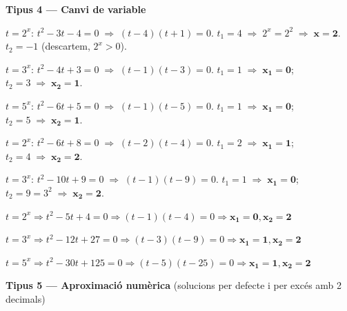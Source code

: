 \documentclass[12pt,a4paper]{article}
\begin{document}
\vspace{0.3cm}

\noindent\textbf{Tipus 4 --- Canvi de variable}

\begin{exercicis}
    \item $t=2^x$: $t^2-3t-4=0 \;\Rightarrow\; (t-4)(t+1)=0$. \quad $t_1=4\;\Rightarrow\;2^x=2^2\;\Rightarrow\;\boldsymbol{x=2}$. \quad $t_2=-1$ (descartem, $2^x>0$).
    \item $t=3^x$: $t^2-4t+3=0 \;\Rightarrow\; (t-1)(t-3)=0$. \quad $t_1=1\;\Rightarrow\;\boldsymbol{x_1=0}$; \quad $t_2=3\;\Rightarrow\;\boldsymbol{x_2=1}$.
    \item $t=5^x$: $t^2-6t+5=0 \;\Rightarrow\; (t-1)(t-5)=0$. \quad $t_1=1\;\Rightarrow\;\boldsymbol{x_1=0}$; \quad $t_2=5\;\Rightarrow\;\boldsymbol{x_2=1}$.
    \item $t=2^x$: $t^2-6t+8=0 \;\Rightarrow\; (t-2)(t-4)=0$. \quad $t_1=2\;\Rightarrow\;\boldsymbol{x_1=1}$; \quad $t_2=4\;\Rightarrow\;\boldsymbol{x_2=2}$.
    \item $t=3^x$: $t^2-10t+9=0 \;\Rightarrow\; (t-1)(t-9)=0$. \quad $t_1=1\;\Rightarrow\;\boldsymbol{x_1=0}$; \quad $t_2=9=3^2\;\Rightarrow\;\boldsymbol{x_2=2}$.
    \item $t=2^x \Rightarrow t^2-5t+4=0 \Rightarrow (t-1)(t-4)=0 \Rightarrow \boldsymbol{x_1=0, x_2=2}$
    \item $t=3^x \Rightarrow t^2-12t+27=0 \Rightarrow (t-3)(t-9)=0 \Rightarrow \boldsymbol{x_1=1, x_2=2}$
    \item $t=5^x \Rightarrow t^2-30t+125=0 \Rightarrow (t-5)(t-25)=0 \Rightarrow \boldsymbol{x_1=1, x_2=2}$
\end{exercicis}

\vspace{0.3cm}

\noindent\textbf{Tipus 5 --- Aproximació numèrica} (solucions per defecte i per excés amb 2 decimals)
\end{document}
